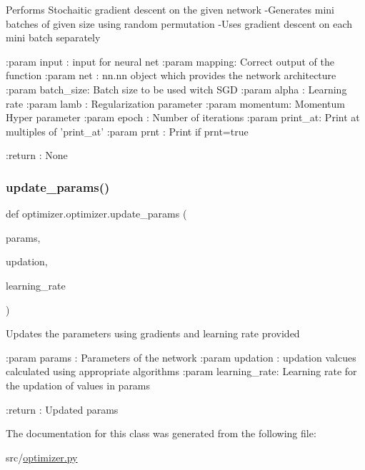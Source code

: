 \begin{DoxyVerb}Performs Stochaitic gradient descent on the given network
-Generates mini batches of given size using random permutation
-Uses gradient descent on each mini batch separately

:param input  : input for neural net
:param mapping: Correct output of the function
:param net    : nn.nn object which provides the network architecture
:param batch_size: Batch size to be used witch SGD
:param alpha  : Learning rate
:param lamb   : Regularization parameter
:param momentum: Momentum Hyper parameter
:param epoch  : Number of iterations
:param print_at: Print at multiples of 'print_at'
:param prnt   : Print if prnt=true

:return : None
\end{DoxyVerb}
 \mbox{\label{classoptimizer_1_1optimizer_ae54007767b7637fc2a1bfd0bc0a71934}} 
\subsubsection{\texorpdfstring{update\+\_\+params()}{update\_params()}}
{\footnotesize\ttfamily def optimizer.\+optimizer.\+update\+\_\+params (\begin{DoxyParamCaption}\item[{}]{params,  }\item[{}]{updation,  }\item[{}]{learning\+\_\+rate }\end{DoxyParamCaption})\hspace{0.3cm}{\ttfamily [static]}}

\begin{DoxyVerb}Updates the parameters using gradients and learning rate provided

:param params   : Parameters of the network
:param updation    : updation valcues calculated using appropriate algorithms
:param learning_rate: Learning rate for the updation of values in params

:return : Updated params 
\end{DoxyVerb}
 

The documentation for this class was generated from the following file\+:\begin{DoxyCompactItemize}
\item 
src/\hyperlink{optimizer_8py}{optimizer.\+py}\end{DoxyCompactItemize}
